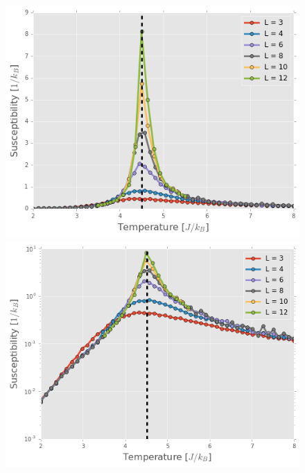 \documentclass[11pt, oneside]{article}
\begin{document}
\begin{figure}[H]
    \vspace*{0cm} %

    \begin{minipage}{0.47\textwidth}
    \includegraphics[width=\linewidth]{img/3D/susc_lin}
    \end{minipage}
    \hspace{\fill} %
    \begin{minipage}{0.47\textwidth}
    \includegraphics[width=\linewidth]{img/3D/susc}
    \end{minipage}

    \vspace*{0cm} %


\end{figure}
\end{document}
